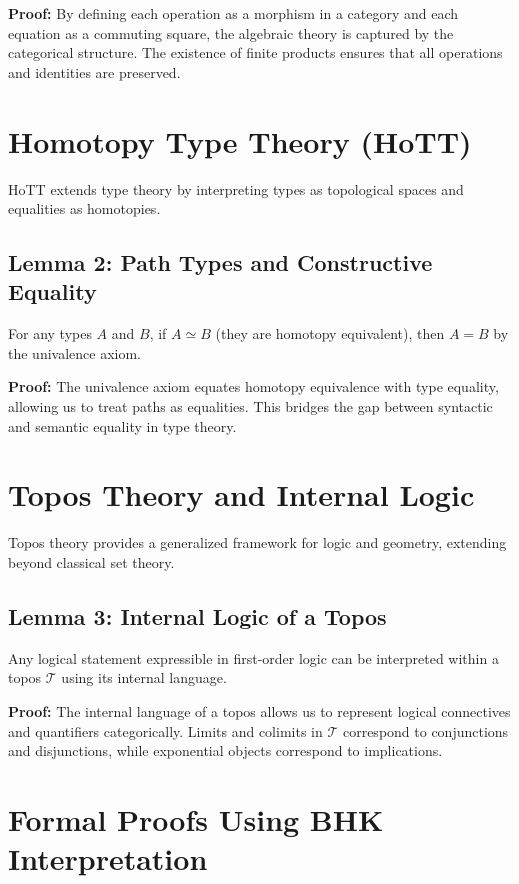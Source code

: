 \documentclass{article}
\begin{document}
\textbf{Proof:} By defining each operation as a morphism in a category and each equation as a commuting square, the algebraic theory is captured by the categorical structure. The existence of finite products ensures that all operations and identities are preserved.


\section{Homotopy Type Theory (HoTT)}

HoTT extends type theory by interpreting types as topological spaces and equalities as homotopies.

\subsection{Lemma 2: Path Types and Constructive Equality}
For any types \( A \) and \( B \), if \( A \simeq B \) (they are homotopy equivalent), then \( A = B \) by the univalence axiom.

\textbf{Proof:} The univalence axiom equates homotopy equivalence with type equality, allowing us to treat paths as equalities. This bridges the gap between syntactic and semantic equality in type theory.


\section{Topos Theory and Internal Logic}

Topos theory provides a generalized framework for logic and geometry, extending beyond classical set theory.

\subsection{Lemma 3: Internal Logic of a Topos}
Any logical statement expressible in first-order logic can be interpreted within a topos \( \mathcal{T} \) using its internal language.

\textbf{Proof:} The internal language of a topos allows us to represent logical connectives and quantifiers categorically. Limits and colimits in \( \mathcal{T} \) correspond to conjunctions and disjunctions, while exponential objects correspond to implications.


\section{Formal Proofs Using BHK Interpretation}
\end{document}
